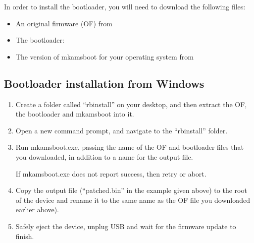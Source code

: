 
In order to install the bootloader, you will need to download the following
files:

\begin{itemize}
  \item An original firmware (OF) from 

  \item The bootloader: 

  \item The version of mkamsboot for your operating system from
\end{itemize}

\subsection{Bootloader installation from Windows}

\begin{enumerate}

\item Create a folder called ``rbinstall'' on your desktop, and then extract
  the OF, the bootloader and mkamsboot into it.

\item Open a new command prompt, and navigate to the ``rbinstall'' folder.

\item Run mkamsboot.exe, passing the name of the OF and bootloader files that
  you downloaded, in addition to a name for the output file.

  \begin{code} 
  \end{code}
 
  If mkamsboot.exe does not report success, then retry or abort.

\item Copy the output file (``patched.bin'' in the example given above) to the
  root of the device and rename it to the same name as the OF file you downloaded earlier 
   
   above).

\item Safely eject the device, unplug USB and wait for the firmware update to finish.
\end{enumerate}

